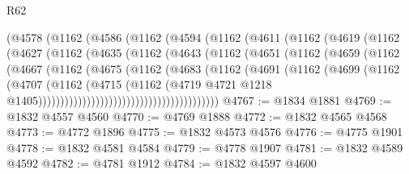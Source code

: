 \begin{lexlean}{R62}
\begin{coremodule}
                (@4578
                  (@1162
                    (@4586
                      (@1162
                        (@4594
                          (@1162
                            (@4611
                              (@1162
                                (@4619
                                  (@1162
                                    (@4627
                                      (@1162
                                        (@4635
                                          (@1162
                                            (@4643
                                              (@1162
                                                (@4651
                                                  (@1162
                                                    (@4659
                                                      (@1162
                                                        (@4667
                                                          (@1162
                                                            (@4675
                                                              (@1162
                                                                (@4683
                                                                  (@1162
                                                                    (@4691
                                                                      (@1162
                                                                        (@4699
                                                                          (@1162
                                                                            (@4707
                                                                              (@1162
                                                                                (@4715
                                                                                  (@1162
                                                                                    (@4719
                                                                                      @4721
                                                                                      @1218
                                                                                      @1405)))))))))))))))))))))))))))))))))))))))))
@4767 := @1834 @1881
@4769 := @1832 @4557 @4560
@4770 := @4769 @1888
@4772 := @1832 @4565 @4568
@4773 := @4772 @1896
@4775 := @1832 @4573 @4576
@4776 := @4775 @1901
@4778 := @1832 @4581 @4584
@4779 := @4778 @1907
@4781 := @1832 @4589 @4592
@4782 := @4781 @1912
@4784 := @1832 @4597 @4600

\end{coremodule}
\end{lexlean}
